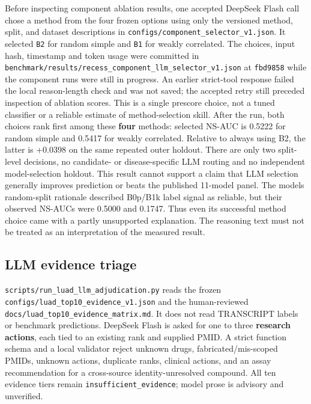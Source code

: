 \documentclass[
  10pt,
]{ctexart}
\begin{document}
Before inspecting component ablation results, one accepted DeepSeek
Flash call chose a method from the four frozen options using only the
versioned method, split, and dataset descriptions in
\texttt{configs/\allowbreak{}component\_\allowbreak{}selector\_\allowbreak{}v1.\allowbreak{}json}. It selected \texttt{B2}
for random simple and \texttt{B1} for weakly correlated. The choices,
input hash, timestamp and token usage were committed in
\texttt{benchmark/\allowbreak{}results/\allowbreak{}recess\_\allowbreak{}component\_\allowbreak{}llm\_\allowbreak{}selector\_\allowbreak{}v1.\allowbreak{}json} at
\texttt{fbd9858} while the component runs were still in progress. An
earlier strict-tool response failed the local reason-length check and
was not saved; the accepted retry still preceded inspection of ablation
scores. This is a single prescore choice, not a tuned classifier or a
reliable estimate of method-selection skill. After the run, both choices
rank first among these \textbf{four} methods: selected NS-AUC is 0.5222
for random simple and 0.5417 for weakly correlated. Relative to always
using B2, the latter is +0.0398 on the same repeated outer holdout.
There are only two split-level decisions, no candidate- or
disease-specific LLM routing and no independent model-selection holdout.
This result cannot support a claim that LLM selection generally improves
prediction or beats the published 11-model panel. The
model\textquotesingle s random-split rationale described B0p/B1k label
signal as reliable, but their observed NS-AUCs were 0.5000 and 0.1747.
Thus even its successful method choice came with a partly unsupported
explanation. The reasoning text must not be treated as an interpretation
of the measured result.

\subsection{LLM evidence triage}\label{llm-evidence-triage}

\texttt{scripts/\allowbreak{}run\_\allowbreak{}luad\_\allowbreak{}llm\_\allowbreak{}adjudication.\allowbreak{}py} reads the frozen
\texttt{configs/\allowbreak{}luad\_\allowbreak{}top10\_\allowbreak{}evidence\_\allowbreak{}v1.\allowbreak{}json} and the human-reviewed
\texttt{docs/\allowbreak{}luad\_\allowbreak{}top10\_\allowbreak{}evidence\_\allowbreak{}matrix.\allowbreak{}md}. It does not read
TRANSCRIPT labels or benchmark predictions. DeepSeek Flash is asked for
one to three \textbf{research actions}, each tied to an existing rank
and supplied PMID. A strict function schema and a local validator reject
unknown drugs, fabricated/mis-scoped PMIDs, unknown actions, duplicate
ranks, clinical actions, and an assay recommendation for a cross-source
identity-unresolved compound. All ten evidence tiers remain
\texttt{insufficient\_\allowbreak{}evidence}; model prose is advisory and unverified.
\end{document}
